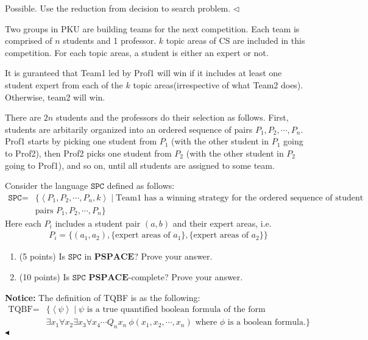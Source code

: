 \documentclass[11pt]{article}
\newenvironment{problem}[2][Question]{\begin{trivlist}
\item[\hskip \labelsep{\bfseries#1}\hskip\labelsep{\bfseries#2.}]}{\hfill$\blacktriangleleft$\end{trivlist}}
\newenvironment{answer}[1][Solution]{\begin{trivlist}
\item[\hskip \labelsep{\bfseries#1.}\hskip \labelsep]}{\hfill$\lhd$\end{trivlist}}
\newcommand{\PSPACE}{\mathbf{PSPACE}}
\begin{document}
\begin{answer}
    Possible. Use the reduction from decision to search problem.
\end{answer}
\newpage
\begin{problem}{5.(15 points)}
    Two groups in PKU are building teams for the next competition. Each team is comprised of $n$ students and 1 professor. $k$ topic areas of CS are included in this competition. For each topic areas, a student is either an expert or not.
    
    It is guranteed that Team1 led by Prof1 will win if it includes at least one student expert from each of the $k$ topic areas(irrespective of what Team2 does). Otherwise, team2 will win.

    There are $2n$ students and the professors do their selection as follows. First, students are arbitarily organized into an ordered sequence of pairs $P_1, P_2, \cdots, P_n$. Prof1 starts by picking one student from $P_1$ (with the other student in $P_1$ going to Prof2), then Prof2 picks one student from $P_2$ (with the other student in $P_2$ going to Prof1), and so on, until all students are assigned to some team.

    Consider the language $\texttt{SPC}$ defined as follows: 
    \begin{align*}
        \texttt{SPC} = &\{\left\langle P_1,P_2,\cdots, P_n, k\right\rangle\mid \text{Team1 has a winning strategy for the ordered sequence of student}
        \\&\text{pairs } P_1, P_2, \cdots, P_n\}
    \end{align*}
    Here each $P_i$ includes a student pair $(a,b)$ and their expert areas, i.e.
    \begin{align*}
        P_i = \{(a_1, a_2), \{\text{expert areas of } a_1\}, \{\text{expert areas of } a_2\}\}
    \end{align*}
    \begin{enumerate}[label=(\alph*)]
        \item (5 points) Is $\texttt{SPC}$ in $\PSPACE$? Prove your answer.
        \item (10 points) Is $\texttt{SPC}$ $\PSPACE$-complete? Prove your answer.
    \end{enumerate}
    \textbf{Notice:} The definition of TQBF is as the following:
    \begin{align*}
        \text{TQBF} = &\{\left\langle \psi \right\rangle\mid \psi \text{ is a true quantified boolean formula of the form} 
        \\&\exists x_1\forall x_2\exists x_3 \forall x_4 \cdots Q_nx_n~\phi(x_1,x_2,\cdots,x_n) \text{ where $\phi$ is a boolean formula.} \}
    \end{align*}
\end{problem}
\end{document}
